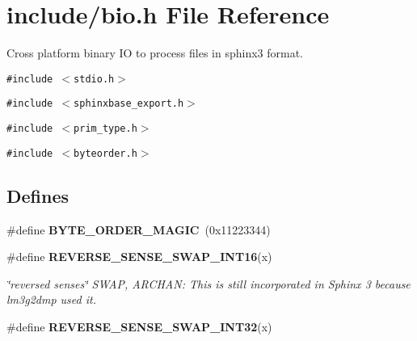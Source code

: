 \section{include/bio.h File Reference}
\label{bio_8h}
Cross platform binary IO to process files in sphinx3 format.  


{\tt \#include $<$stdio.h$>$}\par
{\tt \#include $<$sphinxbase\_\-export.h$>$}\par
{\tt \#include $<$prim\_\-type.h$>$}\par
{\tt \#include $<$byteorder.h$>$}\par
\subsection*{Defines}
\begin{CompactItemize}
\item 
\#define \textbf{BYTE\_\-ORDER\_\-MAGIC}~(0x11223344)\label{bio_8h_c08e1e4728563a03ff6c937bfa8fd845}

\item 
\#define {\bf REVERSE\_\-SENSE\_\-SWAP\_\-INT16}(x)
\begin{CompactList}\small\item\em \char`\"{}reversed senses\char`\"{} SWAP, ARCHAN: This is still incorporated in Sphinx 3 because lm3g2dmp used it. \item\end{CompactList}\item 
\#define \textbf{REVERSE\_\-SENSE\_\-SWAP\_\-INT32}(x)\label{bio_8h_2c277e579a007b5c46bd762a7d18b2cf}

\end{CompactItemize}
